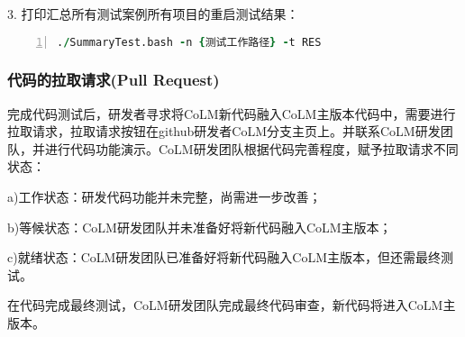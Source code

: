3. 打印汇总所有测试案例所有项目的重启测试结果：

\begin{lstlisting}[language=fortran, basicstyle=\linespread{1.0}\footnotesize\ttfamily, commentstyle=\color{black}, numbers=left, numberstyle=\tiny, xleftmargin=1.5em,xrightmargin=0em, aboveskip=1em]
   ./SummaryTest.bash -n {测试工作路径} -t RES
\end{lstlisting}


\subsubsection{代码的拉取请求(Pull Request)}

完成代码测试后，研发者寻求将CoLM新代码融入CoLM主版本代码中，需要进行拉取请求，拉取请求按钮在github研发者CoLM分支主页上。并联系CoLM研发团队，并进行代码功能演示。CoLM研发团队根据代码完善程度，赋予拉取请求不同状态：

a)工作状态：研发代码功能并未完整，尚需进一步改善；

b)等候状态：CoLM研发团队并未准备好将新代码融入CoLM主版本；

c)就绪状态：CoLM研发团队已准备好将新代码融入CoLM主版本，但还需最终测试。

在代码完成最终测试，CoLM研发团队完成最终代码审查，新代码将进入CoLM主版本。
